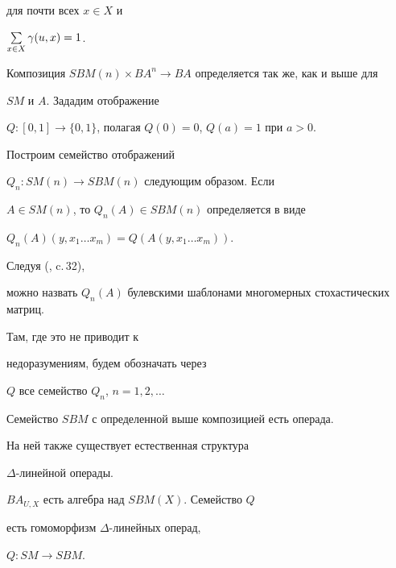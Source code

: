 для почти всех $ x\in X$ и


$\sum \limits_{x \in X} \gamma (u,x)=1$.


Композиция $SBM(n)\times BA^n\to BA$ определяется так же, как и выше для


$SM$ и $A$. Зададим отображение


$Q:[0,1] \to \{0,1\}$, полагая $Q(0)=0$, $Q(a)=1$ при $a>0$.


Построим семейство отображений


$Q_n : SM(n)\to SBM(n)$ следующим образом. Если


$A \in SM(n)$, то $Q_n(A)\in SBM(n)$ определяется в виде


$Q_n(A)(y,x_1\dotsc x_m)= Q(A(y,x_1\dotsc x_m))$.


Следуя (\cite{Buh}, c.\,32),


можно назвать $Q_n(A)$ булевскими шаблонами многомерных стохастических матриц.


Там, где это не приводит к


недоразумениям, будем обозначать через


$Q$ все семейство $Q_n$, $n=1,2,\dotsc$





\begin{thm}\label{m0}


Семейство $SBM$ с определенной выше композицией есть операда.


На ней также существует естественная структура


$\Delta$-линейной операды.


$BA_{U,X}$ есть алгебра над $SBM(X)$. Семейство $Q$


есть гомоморфизм $\Delta$-линейных операд,


$Q:SM \to SBM$.


\end{thm}





